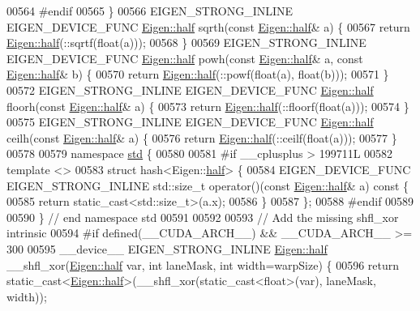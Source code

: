 \begin{DoxyCode}
00564 \textcolor{preprocessor}{#endif}
00565 \}
00566 EIGEN\_STRONG\_INLINE EIGEN\_DEVICE\_FUNC \hyperlink{struct_eigen_1_1half}{Eigen::half} sqrth(\textcolor{keyword}{const} 
      \hyperlink{struct_eigen_1_1half}{Eigen::half}& a) \{
00567   \textcolor{keywordflow}{return} \hyperlink{struct_eigen_1_1half}{Eigen::half}(::sqrtf(\textcolor{keywordtype}{float}(a)));
00568 \}
00569 EIGEN\_STRONG\_INLINE EIGEN\_DEVICE\_FUNC \hyperlink{struct_eigen_1_1half}{Eigen::half} powh(\textcolor{keyword}{const} 
      \hyperlink{struct_eigen_1_1half}{Eigen::half}& a, \textcolor{keyword}{const} \hyperlink{struct_eigen_1_1half}{Eigen::half}& b) \{
00570   \textcolor{keywordflow}{return} \hyperlink{struct_eigen_1_1half}{Eigen::half}(::powf(\textcolor{keywordtype}{float}(a), \textcolor{keywordtype}{float}(b)));
00571 \}
00572 EIGEN\_STRONG\_INLINE EIGEN\_DEVICE\_FUNC \hyperlink{struct_eigen_1_1half}{Eigen::half} floorh(\textcolor{keyword}{const} 
      \hyperlink{struct_eigen_1_1half}{Eigen::half}& a) \{
00573   \textcolor{keywordflow}{return} \hyperlink{struct_eigen_1_1half}{Eigen::half}(::floorf(\textcolor{keywordtype}{float}(a)));
00574 \}
00575 EIGEN\_STRONG\_INLINE EIGEN\_DEVICE\_FUNC \hyperlink{struct_eigen_1_1half}{Eigen::half} ceilh(\textcolor{keyword}{const} 
      \hyperlink{struct_eigen_1_1half}{Eigen::half}& a) \{
00576   \textcolor{keywordflow}{return} \hyperlink{struct_eigen_1_1half}{Eigen::half}(::ceilf(\textcolor{keywordtype}{float}(a)));
00577 \}
00578 
00579 \textcolor{keyword}{namespace }\hyperlink{namespacestd}{std} \{
00580 
00581 \textcolor{preprocessor}{#if \_\_cplusplus > 199711L}
00582 \textcolor{keyword}{template} <>
00583 \textcolor{keyword}{struct }hash<Eigen::\hyperlink{struct_eigen_1_1half}{half}> \{
00584   EIGEN\_DEVICE\_FUNC EIGEN\_STRONG\_INLINE std::size\_t operator()(\textcolor{keyword}{const} \hyperlink{struct_eigen_1_1half}{Eigen::half}& a)\textcolor{keyword}{ const }\{
00585     \textcolor{keywordflow}{return} \textcolor{keyword}{static\_cast<}std::size\_t\textcolor{keyword}{>}(a.x);
00586   \}
00587 \};
00588 \textcolor{preprocessor}{#endif}
00589 
00590 \} \textcolor{comment}{// end namespace std}
00591 
00592 
00593 \textcolor{comment}{// Add the missing shfl\_xor intrinsic}
00594 \textcolor{preprocessor}{#if defined(\_\_CUDA\_ARCH\_\_) && \_\_CUDA\_ARCH\_\_ >= 300}
00595 \_\_device\_\_ EIGEN\_STRONG\_INLINE \hyperlink{struct_eigen_1_1half}{Eigen::half} \_\_shfl\_xor(\hyperlink{struct_eigen_1_1half}{Eigen::half} var, \textcolor{keywordtype}{int} laneMask, \textcolor{keywordtype}{
      int} width=warpSize) \{
00596   \textcolor{keywordflow}{return} \textcolor{keyword}{static\_cast<}\hyperlink{struct_eigen_1_1half}{Eigen::half}\textcolor{keyword}{>}(\_\_shfl\_xor(static\_cast<float>(var), laneMask, width));

\end{DoxyCode}
